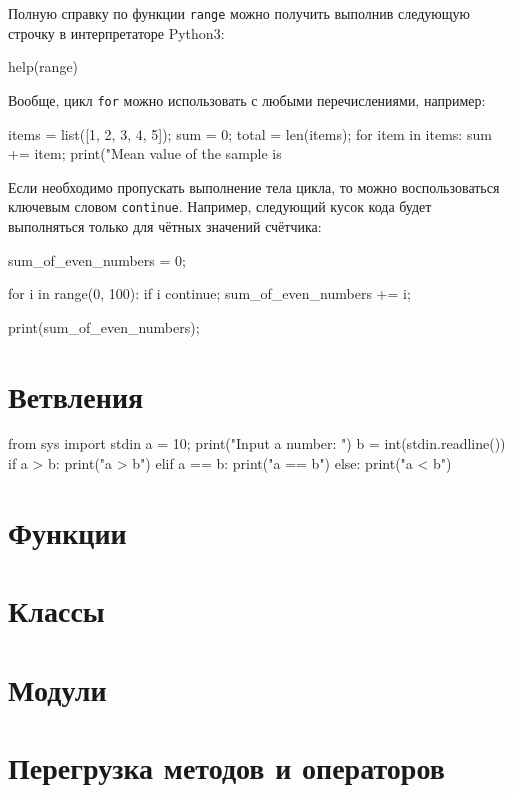 Полную справку по функции \texttt{range} можно получить выполнив
следующую строчку в интерпретаторе Python3:

\begin{python}
help(range)
\end{python}

Вообще, цикл \texttt{for} можно использовать с любыми перечислениями,
например:

\begin{python}
items = list([1, 2, 3, 4, 5]);
sum = 0;
total = len(items);
for item in items:
	sum += item;
print("Mean value of the sample is %
\end{python}

Если необходимо пропускать выполнение тела цикла, то можно 
воспользоваться ключевым словом \texttt{continue}. Например,
следующий кусок кода будет выполняться только для чётных значений
счётчика:

\begin{python}
sum_of_even_numbers = 0;

for i in range(0, 100):
	if i %
		continue;
	sum_of_even_numbers += i;

print(sum_of_even_numbers);

\end{python}

\section{Ветвления}

\begin{python}
from sys import stdin
a = 10;
print("Input a number: ")
b = int(stdin.readline())
if a > b:
	print("a > b")
elif a == b:
	print("a == b")
else:
	print("a < b")
\end{python}

\section{Функции}

\section{Классы}

\section{Модули}

\section{Перегрузка методов и операторов}

